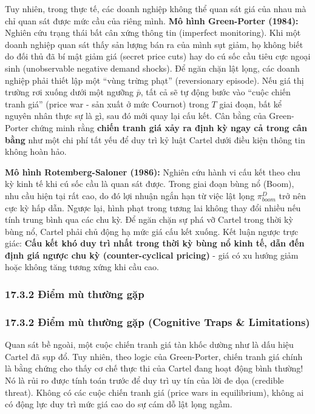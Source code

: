 \documentclass[
]{article}
\begin{document}
Tuy nhiên, trong thực tế, các doanh nghiệp không thể quan sát giá của
nhau mà chỉ quan sát được mức cầu của riêng mình. \textbf{Mô hình
Green-Porter (1984):} Nghiên cứu trạng thái bất cân xứng thông tin
(imperfect monitoring). Khi một doanh nghiệp quan sát thấy sản lượng bán
ra của mình sụt giảm, họ không biết do đối thủ đã bí mật giảm giá
(secret price cuts) hay do cú sốc cầu tiêu cực ngoại sinh (unobservable
negative demand shocks). Để ngăn chặn lật lọng, các doanh nghiệp phải
thiết lập một ``vùng trừng phạt'' (reversionary episode). Nếu giá thị
trường rơi xuống dưới một ngưỡng \(\bar{p}\), tất cả sẽ tự động bước vào
``cuộc chiến tranh giá'' (price war - sản xuất ở mức Cournot) trong
\(T\) giai đoạn, bất kể nguyên nhân thực sự là gì, sau đó mới quay lại
cấu kết. Cân bằng của Green-Porter chứng minh rằng \textbf{chiến tranh
giá xảy ra định kỳ ngay cả trong cân bằng} như một chi phí tất yếu để
duy trì kỷ luật Cartel dưới điều kiện thông tin không hoàn hảo.

\textbf{Mô hình Rotemberg-Saloner (1986):} Nghiên cứu hành vi cấu kết
theo chu kỳ kinh tế khi cú sốc cầu là quan sát được. Trong giai đoạn
bùng nổ (Boom), nhu cầu hiện tại rất cao, do đó lợi nhuận ngắn hạn từ
việc lật lọng \(\pi^D_{boom}\) trở nên cực kỳ hấp dẫn. Ngược lại, hình
phạt trong tương lai không thay đổi nhiều nếu tính trung bình qua các
chu kỳ. Để ngăn chặn sự phá vỡ Cartel trong thời kỳ bùng nổ, Cartel phải
chủ động hạ mức giá cấu kết xuống. Kết luận ngược trực giác: \textbf{Cấu
kết khó duy trì nhất trong thời kỳ bùng nổ kinh tế, dẫn đến định giá
ngược chu kỳ (counter-cyclical pricing)} - giá có xu hướng giảm hoặc
không tăng tương xứng khi cầu cao.

\subsubsection{17.3.2 Điểm mù thường
gặp}\label{ux111iux1ec3m-muxf9-thux1b0ux1eddng-gux1eb7p-15}

\subsubsection{17.3.2 Điểm mù thường gặp (Cognitive Traps \&
Limitations)}\label{ux111iux1ec3m-muxf9-thux1b0ux1eddng-gux1eb7p-cognitive-traps-limitations-121}

Quan sát bề ngoài, một cuộc chiến tranh giá tàn khốc dường như là dấu
hiệu Cartel đã sụp đổ. Tuy nhiên, theo logic của Green-Porter, chiến
tranh giá chính là bằng chứng cho thấy cơ chế thực thi của Cartel đang
hoạt động bình thường! Nó là rủi ro được tính toán trước để duy trì uy
tín của lời đe dọa (credible threat). Không có các cuộc chiến tranh giá
(price wars in equilibrium), không ai có động lực duy trì mức giá cao do
sự cám dỗ lật lọng ngầm.
\end{document}
